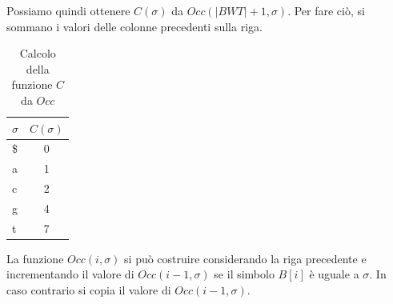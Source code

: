 \begin{esempio}
    Possiamo quindi ottenere $C(\sigma)$ da $Occ(|BWT| + 1,\sigma)$. Per fare ciò,
    si sommano i valori delle colonne precedenti sulla riga.
    \begin{table}[!ht]
        \centering
        \begin{tabular}{|l|c|}
            \hline
            \rowcolor[HTML]{EFEFEF}
            \textbf{$\sigma$} & \textbf{$C(\sigma)$} \\ \hline
            \$                & 0                    \\ \hline
            a                 & 1                    \\ \hline
            c                 & 2                    \\ \hline
            g                 & 4                    \\ \hline
            t                 & 7                    \\ \hline
        \end{tabular}
        \caption{Calcolo della funzione $C$ da $Occ$}
    \end{table}
\end{esempio}
La funzione $Occ(i, \sigma)$ si può costruire considerando la riga precedente e
incrementando il valore di $Occ(i - 1, \sigma)$ se il simbolo $B[i]$ è uguale a
$\sigma$. In caso contrario si copia il valore di $Occ(i - 1, \sigma)$.

